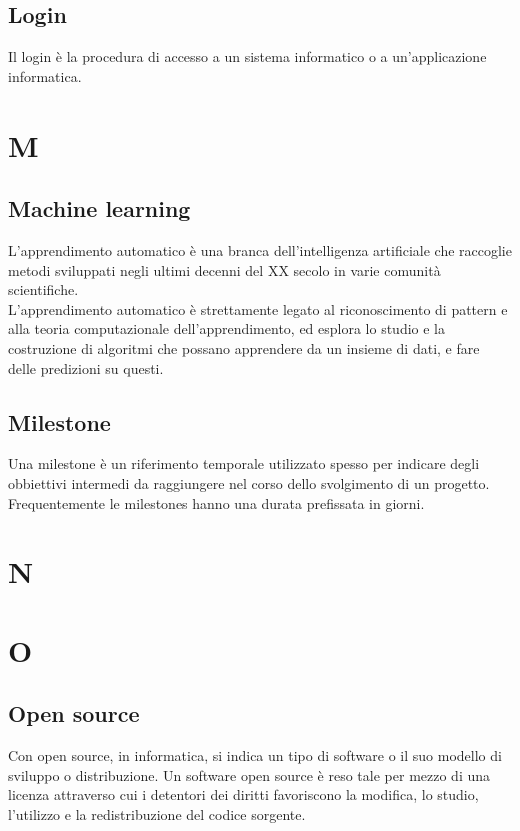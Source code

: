 \subsection{Login}
Il login è la procedura di accesso a un sistema informatico o a un'applicazione informatica.

\newpage
\section{M}
\subsection{Machine learning}
L'apprendimento automatico è una branca dell'intelligenza artificiale che raccoglie metodi sviluppati negli ultimi decenni del XX secolo in varie comunità scientifiche.\\
L'apprendimento automatico è strettamente legato al riconoscimento di pattern e alla teoria computazionale dell'apprendimento, ed esplora lo studio e la costruzione di algoritmi che possano apprendere da un insieme di dati, e fare delle predizioni su questi.

\subsection{Milestone}
Una milestone è un riferimento temporale utilizzato spesso per indicare degli obbiettivi intermedi da raggiungere nel corso dello svolgimento di un progetto. Frequentemente le milestones hanno una durata prefissata in giorni.

\newpage
\section{N}

\newpage
\section{O}
\subsection{Open source}
Con open source, in informatica, si indica un tipo di software o il suo modello di sviluppo o distribuzione. Un software open source è reso tale per mezzo di una licenza attraverso cui i detentori dei diritti favoriscono la modifica, lo studio, l'utilizzo e la redistribuzione del codice sorgente.

